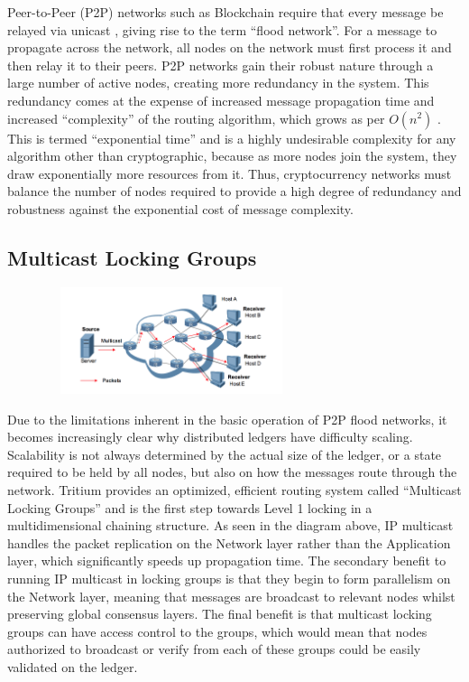 \documentclass[11pt]{article}
\begin{document}
Peer-to-Peer (P2P) networks such as Blockchain require that every message be relayed via unicast \cite{Flood_Networks}, giving rise to the term ``flood network''.
For a message to propagate across the network, all nodes on the network must first process it and then relay it to their peers.
P2P networks gain their robust nature through a large number of active nodes, creating more redundancy in the system.
This redundancy comes at the expense of increased message propagation time and increased ``complexity'' of the routing algorithm, which grows as per $O(n^2)$ \cite{Big_O_Notation}.
This is termed ``exponential time'' and is a highly undesirable complexity for any algorithm other than cryptographic, because as more nodes join the system, they draw exponentially more resources from it.
Thus, cryptocurrency networks must balance the number of nodes required to provide a high degree of redundancy and robustness against the exponential cost of message complexity.

\subsection{Multicast Locking Groups}

\begin{figure}
    \centering
    \vspace{-15pt}
    \hspace{0pt}
    \includegraphics[width=0.58\textwidth]{./images/rsz_multicast.png}
\end{figure}

Due to the limitations inherent in the basic operation of P2P flood networks, it becomes increasingly clear why distributed ledgers have difficulty scaling.
Scalability is not always determined by the actual size of the ledger, or a state required to be held by all nodes, but also on how the messages route through the network.
Tritium provides an optimized, efficient routing system called ``Multicast Locking Groups'' and is the first step towards Level 1 locking in a multidimensional chaining structure.
As seen in the diagram above, IP multicast handles the packet replication on the Network layer rather than the Application layer, which significantly speeds up propagation time.
The secondary benefit to running IP multicast in locking groups is that they begin to form parallelism on the Network layer, meaning that messages are broadcast to relevant nodes whilst preserving global consensus layers.
The final benefit is that multicast locking groups can have access control to the groups, which would mean that nodes authorized to broadcast or verify from each of these groups could be easily validated on the ledger.
\end{document}
